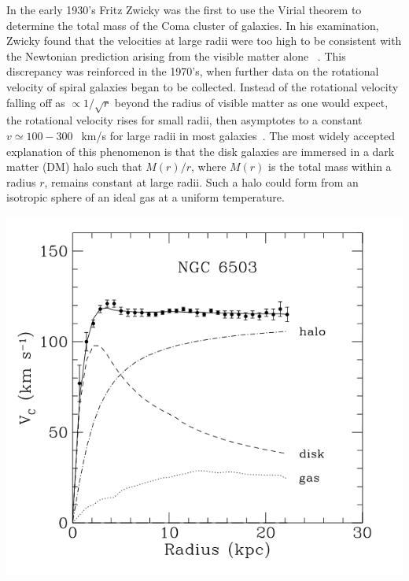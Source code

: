 In the early 1930's Fritz Zwicky was the first to use the Virial theorem to determine the total mass of the Coma cluster of galaxies.  In his examination, Zwicky found that the velocities at large radii were too high to be consistent with the Newtonian prediction arising from the visible matter alone ~\cite{Zwicky}. This discrepancy was reinforced in the 1970's, when further data on the rotational velocity of spiral galaxies began to be collected.  Instead of the rotational velocity falling off as $\propto 1/\sqrt{r}$ beyond the radius of visible matter as one would expect, the rotational velocity rises for small radii, then asymptotes to a constant $ v \simeq 100-300 \; $~km/s for large radii in most galaxies~\cite{Persic,Battaner,Binney}.  The most widely accepted explanation of this phenomenon is that the disk galaxies are immersed in a dark matter (DM) halo such that $ M(r)/r $, where $M(r)$ is the total mass within a radius $r$, remains constant at large radii.  Such a halo could form from an isotropic sphere of an ideal gas at a uniform temperature.

\begin{center}
\includegraphics[scale=.7]{RotationCurve2.png}
\end{center}


